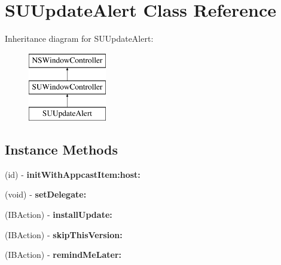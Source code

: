 \hypertarget{interface_s_u_update_alert}{}\section{S\+U\+Update\+Alert Class Reference}
\label{interface_s_u_update_alert}
Inheritance diagram for S\+U\+Update\+Alert\+:\begin{figure}[H]
\begin{center}
\leavevmode
\includegraphics[height=3.000000cm]{interface_s_u_update_alert}
\end{center}
\end{figure}
\subsection*{Instance Methods}
\begin{DoxyCompactItemize}
\item 
\mbox{\label{interface_s_u_update_alert_ac98cd05dbfe782cf7bf650e433fcd7b4}} 
(id) -\/ {\bfseries init\+With\+Appcast\+Item\+:host\+:}
\item 
\mbox{\label{interface_s_u_update_alert_af1f176c15432b4f7dca87c23035356ec}} 
(void) -\/ {\bfseries set\+Delegate\+:}
\item 
\mbox{\label{interface_s_u_update_alert_ac6ec0b2d0ac035d7617d31091b6b79db}} 
(I\+B\+Action) -\/ {\bfseries install\+Update\+:}
\item 
\mbox{\label{interface_s_u_update_alert_a6198cd056e2008cccad21408906f3032}} 
(I\+B\+Action) -\/ {\bfseries skip\+This\+Version\+:}
\item 
\mbox{\label{interface_s_u_update_alert_abebf534d0ecafa9f9698e4a53b95efc5}} 
(I\+B\+Action) -\/ {\bfseries remind\+Me\+Later\+:}
\end{DoxyCompactItemize}
